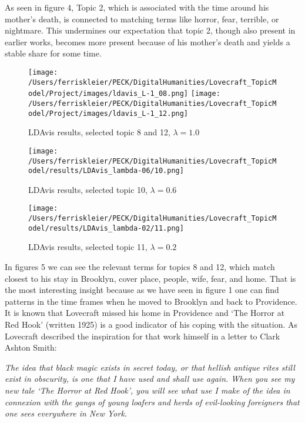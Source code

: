 As seen in figure 4, Topic 2, which is associated with the time around his mother’s death, is 
connected to matching terms like horror, fear, terrible, or nightmare. This undermines our expectation 
that topic 2, though also present in earlier works, becomes more present because of his mother’s death 
and yields a stable share for some time.\\

\begin{figure}[p]
    \centering
    \texttt{[image: /Users/ferriskleier/PECK/DigitalHumanities/Lovecraft\_TopicModel/Project/images/ldavis\_L-1\_08.png]}
    \texttt{[image: /Users/ferriskleier/PECK/DigitalHumanities/Lovecraft\_TopicModel/Project/images/ldavis\_L-1\_12.png]}
    \caption{LDAvis results, selected topic 8 and 12, $\lambda=1.0$}
    \label{fig:mesh5}
\end{figure}

\begin{figure}[p]
    \centering
    \texttt{[image: /Users/ferriskleier/PECK/DigitalHumanities/Lovecraft\_TopicModel/results/LDAvis\_lambda-06/10.png]}
    \caption{LDAvis results, selected topic 10, $\lambda=0.6$}
    \label{fig:mesh6}
\end{figure}

\begin{figure}[ht]
    \centering
    \texttt{[image: /Users/ferriskleier/PECK/DigitalHumanities/Lovecraft\_TopicModel/results/LDAvis\_lambda-02/11.png]}
    \caption{LDAvis results, selected topic 11, $\lambda=0.2$}
    \label{fig:mesh7}
\end{figure}

In figures 5 we can see the relevant terms for topics 8 and 12, which match closest to his stay 
in Brooklyn, cover place, people, wife, fear, and home. That is the most interesting insight because 
as we have seen in figure 1 one can find patterns in the time frames when he moved to Brooklyn and 
back to Providence. It is known that Lovecraft missed his home in Providence and ‘The Horror at 
Red Hook’ (written 1925) is a good indicator of his coping with the situation. As Lovecraft 
described the inspiration for that work himself in a letter to Clark Ashton Smith:

\begin{displayquote}
    \textit{The idea that black magic exists in secret today, or that hellish antique rites still exist in obscurity, is one that I have used and shall use again. When you see my new tale ‘The Horror at Red Hook’, you will see what use I make of the idea in connexion with the gangs of young loafers and herds of evil-looking foreigners that one sees everywhere in New York.}
\end{displayquote}

